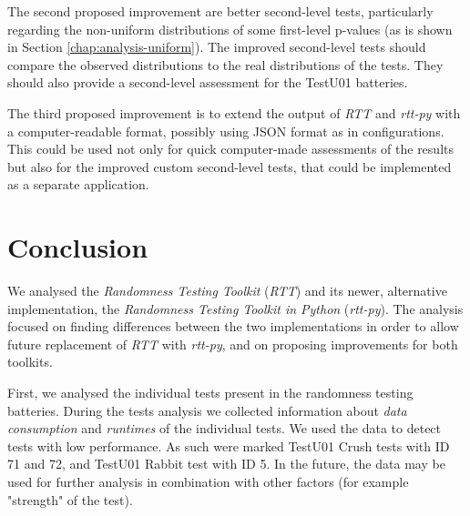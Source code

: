 \documentclass[
  digital,     %
  oneside,     %
  nosansbold,  %
  nocolorbold, %
  nolof,         %
  nolot,         %
]{fithesis4}
\begin{document}
The second proposed improvement are better second-level tests, particularly regarding the non-uniform distributions of some first-level p-values (as is shown in Section \ref{chap:analysis-uniform}). The improved second-level tests should compare the observed distributions to the real distributions of the tests. They should also provide a second-level assessment for the TestU01 batteries.

The third proposed improvement is to extend the output of \emph{RTT} and \emph{rtt-py} with a computer-readable format, possibly using JSON format as in configurations. This could be used not only for quick computer-made assessments of the results but also for the improved custom second-level tests, that could be implemented as a separate application.


\chapter{Conclusion}



We analysed the \emph{Randomness Testing Toolkit} (\emph{RTT}) and its newer, alternative implementation, the \emph{Randomness Testing Toolkit in Python} (\emph{rtt-py}). The analysis focused on finding differences between the two implementations in order to allow future replacement of \emph{RTT} with \emph{rtt-py}, and on proposing improvements for both toolkits.

First, we analysed the individual tests present in the randomness testing batteries. During the tests analysis we collected information about \emph{data consumption} and \emph{runtimes} of the individual tests. We used the data to detect tests with low performance. As such were marked TestU01 Crush tests with ID 71 and 72, and TestU01 Rabbit test with ID 5. In the future, the data may be used for further analysis in combination with other factors (for example "strength" of the test).
\end{document}
